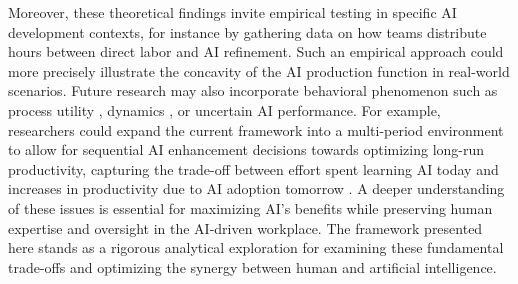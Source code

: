Moreover, these theoretical findings invite empirical testing in specific AI development contexts, for instance by gathering data on how teams distribute hours between direct labor and AI refinement. Such an empirical approach could more precisely illustrate the concavity of the AI production function in real-world scenarios. Future research may also incorporate behavioral phenomenon such as process utility \citep{frey2005beyond}, dynamics \citep{bellman1952theory}, or uncertain AI performance. For example, researchers could expand the current framework into a multi-period environment to allow for sequential AI enhancement decisions towards optimizing long-run productivity, capturing the trade-off between effort spent learning AI today and increases in productivity due to AI adoption tomorrow \citep{arrow1962economic,argote2011organizational}. A deeper understanding of these issues is essential for maximizing AI’s benefits while preserving human expertise and oversight in the AI-driven workplace. The framework presented here stands as a rigorous analytical exploration for examining these fundamental trade-offs and optimizing the synergy between human and artificial intelligence.
